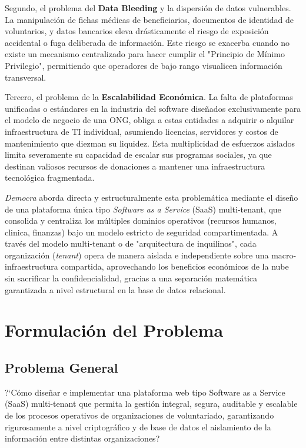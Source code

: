 \documentclass[11pt,a4paper,oneside]{report}
\begin{document}
Segundo, el problema del \textbf{Data Bleeding} y la dispersi\'on de datos vulnerables. La manipulaci\'on de fichas m\'edicas de beneficiarios, documentos de identidad de voluntarios, y datos bancarios eleva dr\'asticamente el riesgo de exposici\'on accidental o fuga deliberada de informaci\'on. Este riesgo se exacerba cuando no existe un mecanismo centralizado para hacer cumplir el "Principio de M\'inimo Privilegio", permitiendo que operadores de bajo rango visualicen información transversal. 

Tercero, el problema de la \textbf{Escalabilidad Econ\'omica}. La falta de plataformas unificadas o estándares en la industria del software diseñados exclusivamente para el modelo de negocio de una ONG, obliga a estas entidades a adquirir o alquilar infraestructura de TI individual, asumiendo licencias, servidores y costos de mantenimiento que diezman su liquidez. Esta multiplicidad de esfuerzos aislados limita severamente su capacidad de escalar sus programas sociales, ya que destinan valiosos recursos de donaciones a mantener una infraestructura tecnol\'ogica fragmentada.

\textit{Democra} aborda directa y estructuralmente esta problem\'atica mediante el dise\~no de una plataforma \'unica tipo \textit{Software as a Service} (SaaS) multi-tenant, que consolida y centraliza los m\'ultiples dominios operativos (recursos humanos, clinica, finanzas) bajo un modelo estricto de seguridad compartimentada. A trav\'es del modelo multi-tenant o de "arquitectura de inquilinos", cada organizaci\'on (\textit{tenant}) opera de manera aislada e independiente sobre una macro-infraestructura compartida, aprovechando los beneficios econ\'omicos de la nube sin sacrificar la confidencialidad, gracias a una separaci\'on matemática garantizada a nivel estructural en la base de datos relacional.

\section{Formulaci\'on del Problema}

\subsection{Problema General}
?`C\'omo dise\~nar e implementar una plataforma web tipo Software as a Service (SaaS) multi-tenant que permita la gesti\'on integral, segura, auditable y escalable de los procesos operativos de organizaciones de voluntariado, garantizando rigurosamente a nivel criptogr\'afico y de base de datos el aislamiento de la informaci\'on entre distintas organizaciones?
\end{document}

